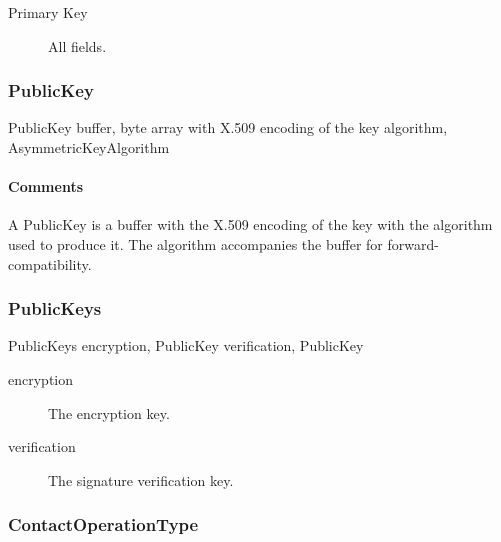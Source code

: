 \documentclass[a4paper,10pt]{article}
\begin{document}
\SpecialItem
\begin{description}
 \item[Primary Key] All fields.
\end{description}

\subsubsection{PublicKey}

\begin{verbbox}
PublicKey
{
  buffer, byte array with X.509 encoding of the key
  algorithm, AsymmetricKeyAlgorithm
}
\end{verbbox}
\begin{center}
\theverbbox
\end{center}

\begin{inparaitem}[ ]
 \item \infrastructure
\end{inparaitem}

\paragraph*{Comments}
A PublicKey is a buffer with the X.509 encoding of the key with the algorithm used to produce it. The algorithm accompanies the buffer for forward-compatibility.

\subsubsection{PublicKeys}

\begin{verbbox}
PublicKeys
{
  encryption, PublicKey
  verification, PublicKey
}
\end{verbbox}
\begin{center}
\theverbbox
\end{center}

\begin{inparaitem}[ ]
 \item \infrastructure
\end{inparaitem}

\SpecialItem
\begin{description}
 \item[encryption] The encryption key.
 \item[verification] The signature verification key.
\end{description}

\subsubsection{ContactOperationType}
\end{document}
